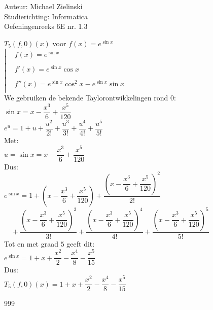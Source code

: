 \documentclass[a4paper]{article}
\begin{document}
  
\noindent \large Auteur: Michael Zielinski \\
\noindent \large Studierichting: Informatica \\
\noindent \large Oefeningenreeks 6E nr. 1.3 \\

\medskip

\normalsize

$T_5(f,0)(x)$ voor $f(x)=e^{\sin x}$ \\

$\left|\begin{array}{ll}
     & f(x)=e^{\sin x} \\
     \\
     & f'(x)=e^{\sin x}\cos x \\
     \\
     & f''(x)=e^{\sin x}\cos^2x-e^{\sin x}\sin x \\
\end{array}\right.$ \\

We gebruiken de bekende Taylorontwikkelingen rond $0$: \\

$ \sin x = x-\dfrac{x^3}{6}+\dfrac{x^5}{120} $ \\

$ e^u = 1+u+\dfrac{u^2}{2!}+\dfrac{u^3}{3!}+\dfrac{u^4}{4!}+\dfrac{u^5}{5!} $ \\

Met: \\

$ u = \sin x = x-\dfrac{x^3}{6}+\dfrac{x^5}{120} $ \\

Dus: \\

$ e^{\sin x}
= 1+\left(x-\dfrac{x^3}{6}+\dfrac{x^5}{120}\right)
+\dfrac{\left(x-\dfrac{x^3}{6}+\dfrac{x^5}{120}\right)^2}{2!} $ \\

$ \quad +\dfrac{\left(x-\dfrac{x^3}{6}+\dfrac{x^5}{120}\right)^3}{3!}
+\dfrac{\left(x-\dfrac{x^3}{6}+\dfrac{x^5}{120}\right)^4}{4!}
+\dfrac{\left(x-\dfrac{x^3}{6}+\dfrac{x^5}{120}\right)^5}{5!} $ \\

Tot en met graad $5$ geeft dit: \\

$ e^{\sin x}
= 1+x+\dfrac{x^2}{2}-\dfrac{x^4}{8}-\dfrac{x^5}{15} $ \\

Dus: \\

$ T_5(f,0)(x)=1+x+\dfrac{x^2}{2}-\dfrac{x^4}{8}-\dfrac{x^5}{15} $ \\

\begin{thebibliography}{999}
\end{thebibliography}
\end{document}
